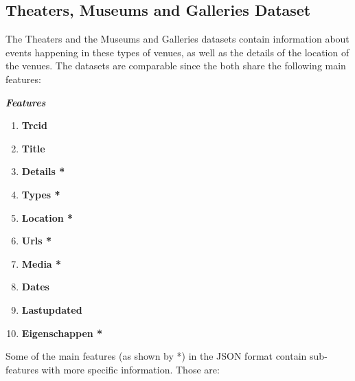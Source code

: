 \documentclass[runningheads,a4paper]{../../StyleFiles/llncs}
\begin{document}
\subsection{Theaters, Museums and Galleries Dataset}
The Theaters and the Museums and Galleries datasets contain information about events happening in these types of venues, as well as the details of the location of the venues. The datasets are comparable since the both share the following main features:

\begin{center}
	\textbf{\emph{Features}}
\begin{multicols}{2}
	\begin{enumerate}
		\item \textbf{Trcid}
		\item \textbf{Title}
		\item \textbf{Details *}
		\item \textbf{Types *}
		\item \textbf{Location *}
		\item \textbf{Urls *}
		\item \textbf{Media *}
		\item \textbf{Dates}
		\item \textbf{Lastupdated}
		\item \textbf{Eigenschappen *} 
		\end{enumerate}
\end{multicols}
\end{center} 

Some of the main features (as shown by *) in the JSON format contain sub-features with more specific information. Those are:
\end{document}

